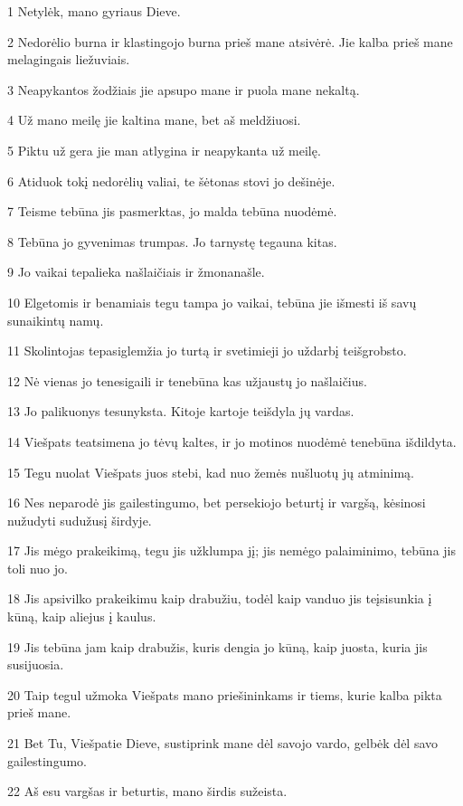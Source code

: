 \par 1 Netylėk, mano gyriaus Dieve. 
\par 2 Nedorėlio burna ir klastingojo burna prieš mane atsivėrė. Jie kalba prieš mane melagingais liežuviais. 
\par 3 Neapykantos žodžiais jie apsupo mane ir puola mane nekaltą. 
\par 4 Už mano meilę jie kaltina mane, bet aš meldžiuosi. 
\par 5 Piktu už gera jie man atlygina ir neapykanta už meilę. 
\par 6 Atiduok tokį nedorėlių valiai, te šėtonas stovi jo dešinėje. 
\par 7 Teisme tebūna jis pasmerktas, jo malda tebūna nuodėmė. 
\par 8 Tebūna jo gyvenimas trumpas. Jo tarnystę tegauna kitas. 
\par 9 Jo vaikai tepalieka našlaičiais ir žmona­našle. 
\par 10 Elgetomis ir benamiais tegu tampa jo vaikai, tebūna jie išmesti iš savų sunaikintų namų. 
\par 11 Skolintojas tepasiglemžia jo turtą ir svetimieji jo uždarbį teišgrobsto. 
\par 12 Nė vienas jo tenesigaili ir tenebūna kas užjaustų jo našlaičius. 
\par 13 Jo palikuonys tesunyksta. Kitoje kartoje teišdyla jų vardas. 
\par 14 Viešpats teatsimena jo tėvų kaltes, ir jo motinos nuodėmė tenebūna išdildyta. 
\par 15 Tegu nuolat Viešpats juos stebi, kad nuo žemės nušluotų jų atminimą. 
\par 16 Nes neparodė jis gailestingumo, bet persekiojo beturtį ir vargšą, kėsinosi nužudyti sudužusį širdyje. 
\par 17 Jis mėgo prakeikimą, tegu jis užklumpa jį; jis nemėgo palaiminimo, tebūna jis toli nuo jo. 
\par 18 Jis apsivilko prakeikimu kaip drabužiu, todėl kaip vanduo jis teįsisunkia į kūną, kaip aliejus į kaulus. 
\par 19 Jis tebūna jam kaip drabužis, kuris dengia jo kūną, kaip juosta, kuria jis susijuosia. 
\par 20 Taip tegul užmoka Viešpats mano priešininkams ir tiems, kurie kalba pikta prieš mane. 
\par 21 Bet Tu, Viešpatie Dieve, sustiprink mane dėl savojo vardo, gelbėk dėl savo gailestingumo. 
\par 22 Aš esu vargšas ir beturtis, mano širdis sužeista. 
